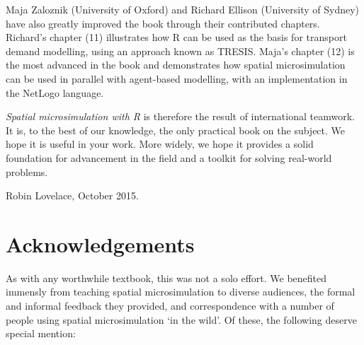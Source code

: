 Maja Zaloznik
(University of Oxford)
and Richard Ellison (University of Sydney) have also greatly improved the book
through their contributed chapters.
Richard's chapter (11) illustrates how R can be used as the basis for transport
demand modelling, using an approach known as TRESIS. Maja's chapter (12)
is the most advanced in the book and demonstrates how spatial microsimulation
can be used in parallel with agent-based modelling, with an implementation in the
NetLogo language.



\emph{Spatial microsimulation with R} is therefore the
result of international teamwork.
It is, to the best of our knowledge, the only practical book on the subject.
We hope it is useful in your work.
More widely, we hope it provides
a solid foundation for advancement in the
field and a toolkit for solving real-world problems.


Robin Lovelace, October 2015.




 \section{Acknowledgements}
 
 As with any worthwhile textbook, this was not a solo effort. We benefited
 immensly from teaching spatial microsimulation to diverse audiences, the
 formal and informal feedback they provided, and correspondence with a number
 of people using spatial microsimulation `in the wild'. Of these,
 the following deserve special mention:
 
